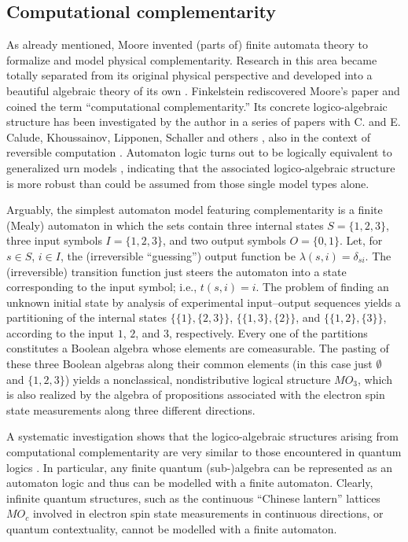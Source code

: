 \documentclass[pre,preprint,showpacs,showkeys,amsfonts]{revtex4}
\begin{document}
\subsection{Computational complementarity}
As already mentioned, Moore \cite{e-f-moore} invented (parts of) finite automata theory
to formalize and model physical complementarity.
Research in this area became totally separated from its original physical perspective
and developed into a beautiful algebraic theory of its own \cite{brauer-84}.
Finkelstein \cite{finkelstein-83} rediscovered Moore's paper
and coined the term ``computational complementarity.''
Its concrete logico-algebraic structure has been investigated by the author
in a series of papers with  C. and E. Calude, Khoussainov, Lipponen, Schaller and others
\cite{svozil-93,schaller-96,cal-sv-yu,svozil-ql},
also in the context of reversible computation \cite{sv-aut-rev,svozil-2002-kyoto}.
Automaton logic turns out to be logically equivalent
\cite{svozil-2001-eua}
to generalized urn models
\cite{wright:pent,wright},
indicating that the associated logico-algebraic structure
is more robust than could be assumed from those single model types alone.

Arguably, the simplest automaton model featuring complementarity
is a finite (Mealy) automaton in which the sets contain
three internal states
$S=\{1,2,3\}$,
three input symbols
$I=\{1,2,3\}$,
and two output symbols
$O=\{0,1\}$.
Let, for $s\in S$, $i\in I$,
the (irreversible ``guessing'') output function be
$\lambda (s,i)=\delta_{si}$.
The (irreversible) transition function just steers the automaton
into a state corresponding to the input symbol; i.e.,
$t(s,i)=i$.
The problem of finding an unknown initial state by
analysis of experimental input--output sequences
yields a partitioning of the internal states
$\{\{1\},\{2,3\}\}$,
$\{\{1,3\},\{2\}\}$, and
$\{\{1,2\},\{3\}\}$,
according to the input $1$, $2$, and $3$, respectively.
Every one of the partitions constitutes a Boolean algebra
whose elements are comeasurable.
The pasting of these three Boolean algebras along their common elements
(in this case just $\emptyset$ and $\{1,2,3\}$) yields a
nonclassical, nondistributive logical structure $MO_3$, which is also
realized by the algebra
of propositions associated with the electron spin state measurements along three
different directions.


A systematic investigation shows that the logico-algebraic structures
arising from computational complementarity are very similar to those encountered in
quantum logics \cite[Sec. 3.5.2]{svozil-ql}. In particular,
any finite quantum (sub-)algebra can be represented as an automaton logic and thus
can be modelled with a finite automaton.
Clearly, infinite quantum structures, such as the continuous ``Chinese lantern'' lattices $MO_c$
involved in electron spin state measurements in continuous directions,
or quantum contextuality, cannot be modelled with a finite automaton.
\end{document}
